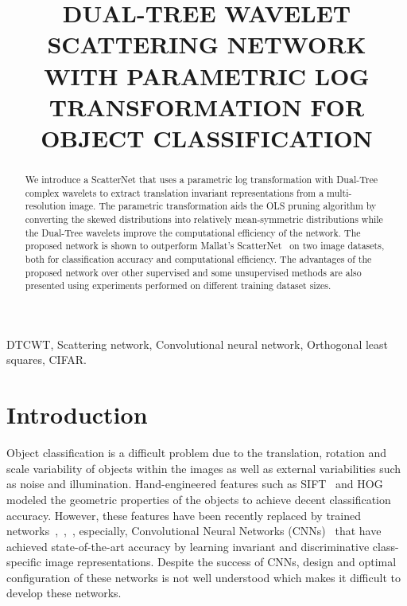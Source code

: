 \documentclass{article}
\title{DUAL-TREE WAVELET SCATTERING NETWORK WITH PARAMETRIC LOG TRANSFORMATION FOR OBJECT CLASSIFICATION}
\begin{document}
%
\maketitle
%
\begin{abstract}
We introduce a ScatterNet that uses a parametric log transformation with Dual-Tree complex wavelets to extract translation invariant representations from a multi-resolution image. The parametric transformation aids the OLS pruning algorithm by converting the skewed distributions into relatively mean-symmetric distributions while the Dual-Tree wavelets improve the computational efficiency of the network. The proposed network is shown to outperform Mallat's ScatterNet~\cite{Oyallon2015} on two image datasets, both for classification accuracy and computational efficiency. The advantages of the proposed network over other supervised and some unsupervised methods are also presented using experiments performed on different training dataset sizes.
\end{abstract}
%
\begin{keywords}
DTCWT, Scattering network, Convolutional neural network, Orthogonal least squares, CIFAR.
\end{keywords}
%
\section{Introduction}
\label{sec:intro}

Object classification is a difficult problem due to the translation, rotation and scale variability of objects within the images as well as external variabilities such as noise and illumination. Hand-engineered features such as SIFT~\cite{lowe} and HOG~\cite{dalal} modeled the geometric properties of the objects to achieve decent classification accuracy. However, these features have been recently replaced by trained networks~\cite{jia},~\cite{lee},~\cite{NIN}, especially, Convolutional Neural Networks (CNNs)~\cite{NIN} that have achieved state-of-the-art accuracy by learning invariant and discriminative class-specific image representations. Despite the success of CNNs, design and optimal configuration of these networks is not well understood which makes it difficult to develop these networks. 
\end{document}
